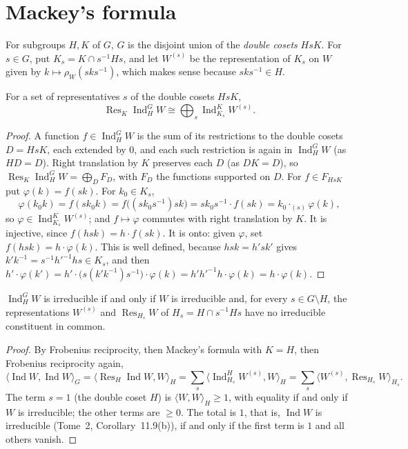 \section{Mackey's formula}

For subgroups $H,K$ of $G$, $G$ is the disjoint union of the \emph{double cosets} $HsK$. For $s\in G$, put $K_s=K\cap s^{-1}Hs$, and let $W^{(s)}$ be the representation of $K_s$ on $W$ given by $k\mapsto\rho_W(sks^{-1})$, which makes
sense because $sks^{-1}\in H$.

\begin{theorem}[Mackey, 1951]\label{thm:mackey}
For a set of representatives $s$ of the double cosets $HsK$,
\[
\operatorname{Res}_K\operatorname{Ind}_H^GW\cong\bigoplus_{s}\operatorname{Ind}_{K_s}^KW^{(s)}.
\]
\end{theorem}

\begin{proof}
A function $f\in\operatorname{Ind}_H^GW$ is the sum of its restrictions to the double cosets $D=HsK$, each extended by $0$, and each such restriction is again in $\operatorname{Ind}_H^GW$ (as $HD=D$). Right translation by $K$
preserves each $D$ (as $DK=D$), so $\operatorname{Res}_K\operatorname{Ind}_H^GW=\bigoplus_DF_D$, with $F_D$ the functions supported on $D$. For $f\in F_{HsK}$ put $\varphi(k)=f(sk)$. For $k_0\in K_s$,
\[
\varphi(k_0k)=f(sk_0k)=f\bigl((sk_0s^{-1})sk\bigr)=sk_0s^{-1}\cdot f(sk)=k_0\cdot_{(s)}\varphi(k),
\]
so $\varphi\in\operatorname{Ind}_{K_s}^KW^{(s)}$; and $f\mapsto\varphi$ commutes with right translation by $K$. It is injective, since $f(hsk)=h\cdot f(sk)$. It is onto: given $\varphi$, set $f(hsk)=h\cdot\varphi(k)$. This is well defined, because
$hsk=h'sk'$ gives $k'k^{-1}=s^{-1}h'^{-1}hs\in K_s$, and then $h'\cdot\varphi(k')=h'\cdot\bigl(s(k'k^{-1})s^{-1}\bigr)\cdot\varphi(k)=h'h'^{-1}h\cdot\varphi(k)=h\cdot\varphi(k)$.
\end{proof}

\begin{corollary}\label{cor:mackeyirr}
$\operatorname{Ind}_H^GW$ is irreducible if and only if $W$ is irreducible and, for every $s\in G\setminus H$, the representations $W^{(s)}$ and $\operatorname{Res}_{H_s}W$ of $H_s=H\cap s^{-1}Hs$ have no irreducible constituent in common.
\end{corollary}

\begin{proof}
By Frobenius reciprocity, then Mackey's formula with $K=H$, then Frobenius reciprocity again,
\[
\langle\operatorname{Ind}W,\operatorname{Ind}W\rangle_G=\langle\operatorname{Res}_H\operatorname{Ind}W,W\rangle_H=\sum_s\langle\operatorname{Ind}_{H_s}^HW^{(s)},W\rangle_H=\sum_s\langle W^{(s)},\operatorname{Res}_{H_s}W\rangle_{H_s}.
\]
The term $s=1$ (the double coset $H$) is $\langle W,W\rangle_H\ge1$, with equality if and only if $W$ is irreducible; the other terms are $\ge0$. The total is $1$, that is, $\operatorname{Ind}W$ is irreducible (Tome~2, Corollary~11.9(b)), if and only
if the first term is $1$ and all others vanish.
\end{proof}

